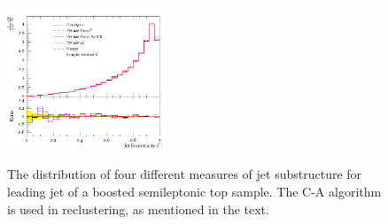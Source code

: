 \begin{figure}[t!]
\includegraphics[width=0.42\textwidth]{MC_SUBSTRUCTURE_Eccentricity.pdf} \\
         \caption[]{The distribution 
         of four different measures of jet substructure
         for leading jet of a boosted semileptonic top sample. 
         The C-A algorithm is used in reclustering, as mentioned in the text.}
  \label{fig:substructureobservables}
\end{figure}



